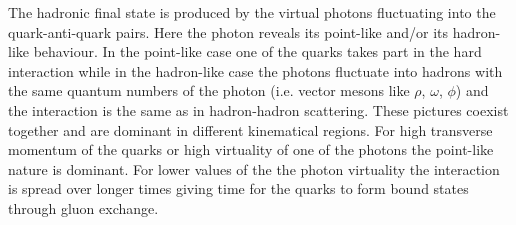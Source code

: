 \documentclass[preprint, 12pt]{elsarticle}
\begin{document}

The hadronic final state is produced by the virtual photons fluctuating into the quark-anti-quark pairs. Here the photon reveals its point-like and/or its hadron-like behaviour. In the point-like case one of the quarks takes part in the hard interaction while in the hadron-like case the photons fluctuate into hadrons with the same quantum numbers of the photon (i.e. vector mesons like $\rho$, $\omega$, $\phi$) and the interaction is the same as in hadron-hadron scattering. These pictures coexist together and are dominant in different kinematical regions. For high transverse momentum of the quarks or high virtuality of one of the photons the point-like nature is dominant. For lower values of the the photon virtuality the interaction is spread over longer times giving time for the quarks to form bound states through gluon exchange.
\end{document}

